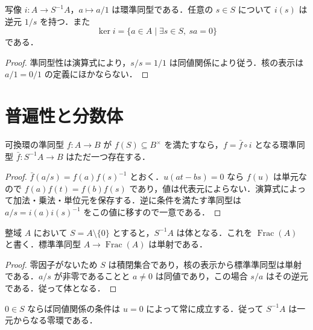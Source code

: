 \begin{prop}[局所化の標準準同型]
写像 $i:A\to S^{-1}A$，$a\mapsto a/1$ は環準同型である．任意の $s\in S$ について $i(s)$ は逆元 $1/s$ を持つ．また
\[
\ker i=\{a\in A\mid \exists s\in S,\ sa=0\}
\]
である．
\end{prop}
\begin{proof}
準同型性は演算式により，$s/s=1/1$ は同値関係により従う．核の表示は $a/1=0/1$ の定義にほかならない．
\end{proof}
\section{普遍性と分数体}
\begin{prop}[局所化の普遍性]
可換環の準同型 $f:A\to B$ が $f(S)\subseteq B^\times$ を満たすなら，$f=\bar f\circ i$ となる環準同型 $\bar f:S^{-1}A\to B$ はただ一つ存在する．
\end{prop}
\begin{proof}
$\bar f(a/s)=f(a)f(s)^{-1}$ とおく．$u(at-bs)=0$ なら $f(u)$ は単元なので $f(a)f(t)=f(b)f(s)$ であり，値は代表元によらない．演算式によって加法・乗法・単位元を保存する．逆に条件を満たす準同型は $a/s=i(a)i(s)^{-1}$ をこの値に移すので一意である．
\end{proof}
\begin{prop}[整域の分数体]
整域 $A$ において $S=A\setminus\{0\}$ とすると，$S^{-1}A$ は体となる．これを $\operatorname{Frac}(A)$ と書く．標準準同型 $A\to\operatorname{Frac}(A)$ は単射である．
\end{prop}
\begin{proof}
零因子がないため $S$ は積閉集合であり，核の表示から標準準同型は単射である．$a/s$ が非零であることと $a\ne0$ は同値であり，この場合 $s/a$ はその逆元である．従って体となる．
\end{proof}
\begin{prop}[零元を含む積閉集合]
$0\in S$ ならば同値関係の条件は $u=0$ によって常に成立する．従って $S^{-1}A$ は一元からなる零環である．
\end{prop}
